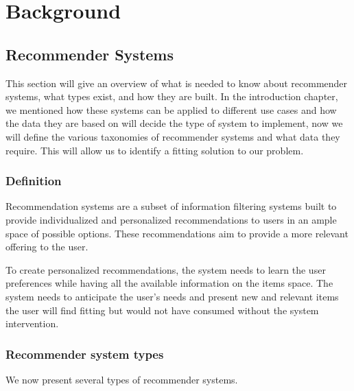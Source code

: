 \documentclass{tex_files/kththesis}
\begin{document}
\chapter{Background}
\section{Recommender Systems}
This section will give an overview of what is needed to know about recommender systems, what types exist, and how they are built. In the introduction chapter, we mentioned how these systems can be applied to different use cases and how the data they are based on will decide the type of system to implement, now we will define the various taxonomies of recommender systems and what data they require. This will allow us to identify a fitting solution to our problem.

\subsection{Definition}
Recommendation systems are a subset of information filtering systems built to provide individualized and personalized recommendations to users in an ample space of possible options. These recommendations aim to provide a more relevant offering to the user.

To create personalized recommendations, the system needs to learn the user preferences while having all the available information on the items space. The system needs to anticipate the user's needs and present new and relevant items the user will find fitting but would not have consumed without the system intervention.

\subsection{Recommender system types}

We now present several types of recommender systems.
\end{document}
